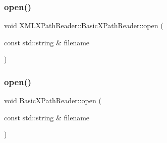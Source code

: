 \subsubsection{\texorpdfstring{open()}{open()}\hspace{0.1cm}{\footnotesize\ttfamily [1/6]}}
{\footnotesize\ttfamily void X\+M\+L\+X\+Path\+Reader\+::\+Basic\+X\+Path\+Reader\+::open (\begin{DoxyParamCaption}\item[{const std\+::string \&}]{filename }\end{DoxyParamCaption})}

\mbox{\label{classXMLXPathReader_1_1BasicXPathReader_a453ed92ad20f71b672f3b92e91e40b1c}} 
\subsubsection{\texorpdfstring{open()}{open()}\hspace{0.1cm}{\footnotesize\ttfamily [2/6]}}
{\footnotesize\ttfamily void Basic\+X\+Path\+Reader\+::open (\begin{DoxyParamCaption}\item[{const std\+::string \&}]{filename }\end{DoxyParamCaption})}

